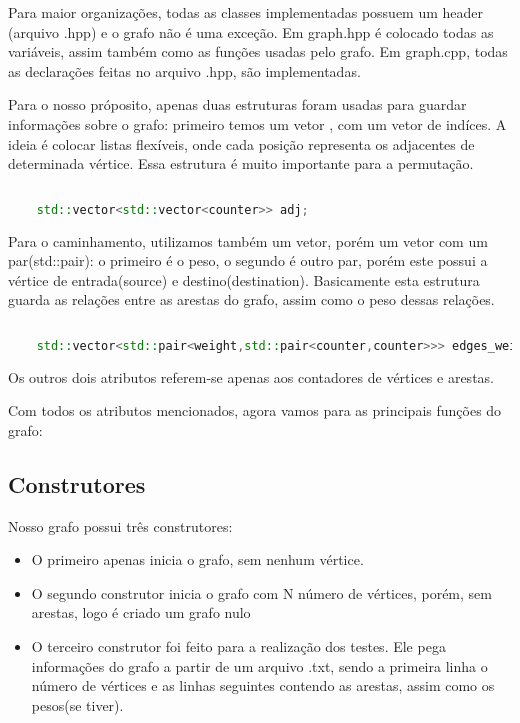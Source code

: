 \documentclass[12pt]{article}
\begin{document}
  Para maior organizações, todas as classes implementadas possuem um header (arquivo .hpp)
  e o grafo não é uma exceção. Em graph.hpp é colocado todas as variáveis, assim também como as 
  funções usadas pelo grafo. Em graph.cpp, todas as declarações feitas no arquivo .hpp, são 
  implementadas.
  
  Para o nosso próposito, apenas duas estruturas foram usadas para guardar informações sobre
  o grafo: primeiro temos um vetor , com um vetor de indíces. A ideia é colocar listas flexíveis,
  onde cada posição representa os adjacentes de determinada vértice. Essa estrutura é muito
  importante para a permutação. 

  \begin{lstlisting}[language=c++]
    
    std::vector<std::vector<counter>> adj;
  \end{lstlisting}

  Para o caminhamento, utilizamos também um vetor, porém um vetor com um par(std::pair): 
  o primeiro é o peso, o segundo é outro par, porém este possui a vértice de entrada(source)
  e destino(destination). Basicamente esta estrutura guarda as relações entre as arestas 
  do grafo, assim como o peso dessas relações.

  \begin{lstlisting}[language=c++]
    
    std::vector<std::pair<weight,std::pair<counter,counter>>> edges_weights;
  \end{lstlisting}

  Os outros dois atributos referem-se apenas aos contadores de vértices e arestas.

  Com todos os atributos mencionados, agora vamos para as principais funções do grafo:

  \subsection{Construtores}

  Nosso grafo possui três construtores:

  \begin{itemize}
    \item O primeiro apenas inicia o grafo, sem nenhum vértice. 
    \item O segundo construtor inicia o grafo com N número de vértices, porém, sem arestas,
    logo é criado um grafo nulo
    \item O terceiro construtor foi feito para a realização dos testes. Ele pega informações do
    grafo a partir de um arquivo .txt, sendo a primeira linha o número de vértices e as linhas 
    seguintes contendo as arestas, assim como os pesos(se tiver).
  \end{itemize}
\end{document}
